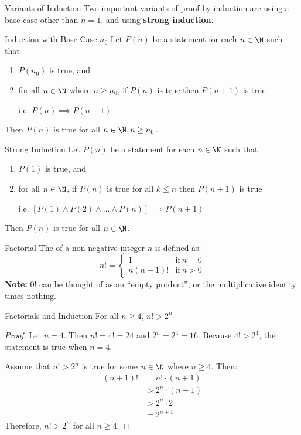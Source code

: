 \documentclass[letterpaper,12pt]{report}
\begin{document}
\begin{genbox}{Variants of Induction}
	Two important variants of proof by induction are using a base case other than $n=1$, and using \textbf{strong induction}.
\end{genbox}

\begin{thmbox}{Induction with Base Case $n_0$}{}
	Let $P(n)$ be a statement for each $n \in \N$ such that
	\begin{enumerate}
		\item $P(n_0)$ is true, and
		\item for all $n \in \N$ where $n \geq n_0$, if $P(n)$ is true then $P(n+1)$ is true

		i.e. $P(n) \implies P(n+1)$
	\end{enumerate}

	Then $P(n)$ is true for all $n \in \N, n \geq n_0$.
\end{thmbox}

\begin{thmbox}{Strong Induction}{}
	Let $P(n)$ be a statement for each $n \in \N$ such that
	\begin{enumerate}
		\item $P(1)$ is true, and
		\item for all $n \in \N$, if $P(n)$ is true for all $k \leq n$ then $P(n+1)$ is true

		i.e. $\left[ P(1) \land P(2) \land \ldots \land P(n) \right] \implies P(n+1)$
	\end{enumerate}
	Then $P(n)$ is true for all $n \in \N$.
\end{thmbox}

\begin{dfnbox}{Factorial}{}
	The  of a non-negative integer $n$ is defined as:
	$$n! = \begin{cases}
		1 & \text{if}\ n=0 \\
		n(n-1)! & \text{if}\ n > 0
	\end{cases}$$
	\tcblower
	\textbf{Note:} $0!$ can be thought of as an ``empty product'', or the multiplicative identity times nothing.
\end{dfnbox}

\begin{exbox}{Factorials and Induction}{}
	For all $n \geq 4$, $n! > 2^n$
	\tcblower
	\begin{proof}
		Let $n=4$. Then $n! = 4! = 24$ and $2^n = 2^4 = 16$. Because $4! > 2^4$, the statement is true when $n=4$.

		Assume that $n!>2^n$ is true for some $n \in \N$ where $n \geq 4$. Then:
		\begin{align*}
			(n+1)! &= n! \cdot (n+1) \\
			&> 2^n \cdot (n+1) \\
			&> 2^n \cdot 2 \\
			&= 2^{n+1}
		\end{align*}
		Therefore, $n! > 2^n$ for all $n \geq 4$.
	\end{proof}
\end{exbox}
\end{document}
